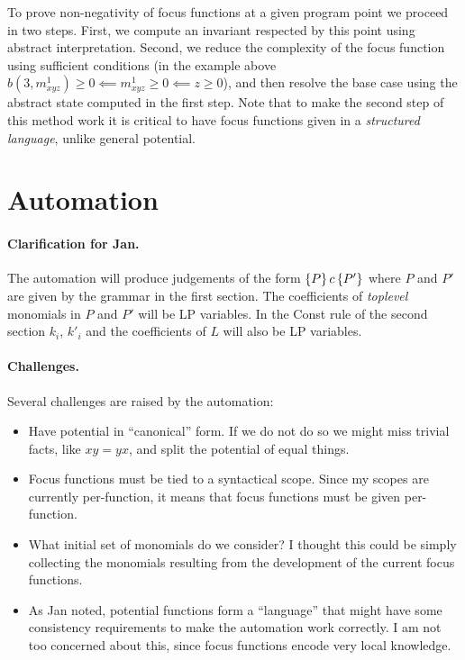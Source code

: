 \documentclass[nocopyrightspace,preprint]{sigplanconf-pldi15}
\begin{document}
To prove non-negativity of focus functions at a given program
point we proceed in two steps. First, we compute an invariant
respected by this point using abstract interpretation.  Second,
we reduce the complexity of the focus function using sufficient
conditions (in the example above $b(3, m_{xyz}^1) \ge 0 \impliedby
m_{xyz}^1 \ge 0 \impliedby z \ge 0$), and then resolve the base
case using the abstract state computed in the first step.  Note
that to make the second step of this method work it is critical
to have focus functions given in a \emph{structured language},
unlike general potential.

\section{Automation}

\paragraph{Clarification for Jan.} The automation will produce
judgements of the form $\{P\}\, c\, \{P'\}$ where $P$ and $P'$
are given by the grammar in the first section.  The coefficients
of \emph{toplevel} monomials in $P$ and $P'$ will be LP variables.
In the {\sc Const} rule of the second section $k_i$, $k'_i$ and
the coefficients of $L$ will also be LP variables.

\paragraph{Challenges.}
Several challenges are raised by the automation:

\begin{itemize}
\item Have potential in ``canonical'' form.  If we do not do
  so we might miss trivial facts, like $xy = yx$, and split
  the potential of equal things.
\item Focus functions must be tied to a syntactical scope.
  Since my scopes are currently per-function, it means that focus
  functions must be given per-function.
\item What initial set of monomials do we consider?  I thought
  this could be simply collecting the monomials resulting from the
  development of the current focus functions.
\item As Jan noted, potential functions form a ``language'' that
  might have some consistency requirements to make the automation
  work correctly.  I am not too concerned about this, since focus
  functions encode very local knowledge.
\end{itemize}
\end{document}
